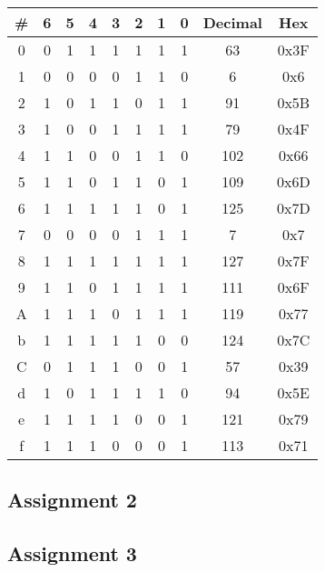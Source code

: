 \documentclass[
	letterpaper, %
	10pt, %
]{CSUniSchoolLabReport}
\begin{document}
   \begin{center}
      \begin{tabular}[h!]{| c | c | c | c | c | c | c | c | c | c |}
        \hline
        \# & 6 & 5 & 4 & 3 & 2 & 1 & 0 & Decimal & Hex \\
        \hline
        0 & 0 & 1 & 1 & 1 & 1 & 1 & 1 & 63 & 0x3F\\
        \hline
        1 & 0 & 0 & 0 & 0 & 1 & 1 & 0 & 6 & 0x6\\
        \hline
        2 & 1 & 0 & 1 & 1 & 0 & 1 & 1 & 91 & 0x5B\\
        \hline
        3 & 1 & 0 & 0 & 1 & 1 & 1 & 1 & 79 & 0x4F\\
        \hline
        4 & 1 & 1 & 0 & 0 & 1 & 1 & 0 & 102 & 0x66\\
        \hline
        5 & 1 & 1 & 0 & 1 & 1 & 0 & 1 & 109 & 0x6D\\
        \hline
        6 & 1 & 1 & 1 & 1 & 1 & 0 & 1 & 125 & 0x7D\\
        \hline
        7 & 0 & 0 & 0 & 0 & 1 & 1 & 1 & 7 & 0x7\\
        \hline
        8 & 1 & 1 & 1 & 1 & 1 & 1 & 1 & 127 & 0x7F\\
        \hline
        9 & 1 & 1 & 0 & 1 & 1 & 1 & 1 & 111 & 0x6F\\
        \hline
        A & 1 & 1 & 1 & 0 & 1 & 1 & 1 & 119 & 0x77\\
        \hline
        b & 1 & 1 & 1 & 1 & 1 & 0 & 0 & 124 & 0x7C\\
        \hline
        C & 0 & 1 & 1 & 1 & 0 & 0 & 1 & 57 & 0x39\\
        \hline
        d & 1 & 0 & 1 & 1 & 1 & 1 & 0 & 94 & 0x5E\\
        \hline
        e & 1 & 1 & 1 & 1 & 0 & 0 & 1 & 121 & 0x79\\
        \hline
        f & 1 & 1 & 1 & 0 & 0 & 0 & 1 & 113 & 0x71\\
        \hline
      \end{tabular}
    \end{center}

\subsection{Assignment 2}

\subsection{Assignment 3}
\end{document}
